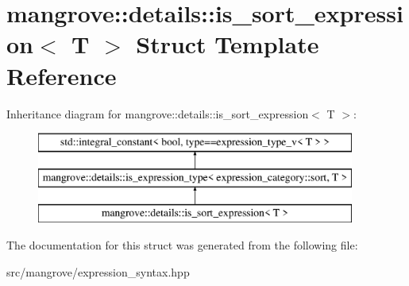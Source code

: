 \hypertarget{structmangrove_1_1details_1_1is__sort__expression}{}\section{mangrove\+:\+:details\+:\+:is\+\_\+sort\+\_\+expression$<$ T $>$ Struct Template Reference}
\label{structmangrove_1_1details_1_1is__sort__expression}
Inheritance diagram for mangrove\+:\+:details\+:\+:is\+\_\+sort\+\_\+expression$<$ T $>$\+:\begin{figure}[H]
\begin{center}
\leavevmode
\includegraphics[height=3.000000cm]{structmangrove_1_1details_1_1is__sort__expression}
\end{center}
\end{figure}


The documentation for this struct was generated from the following file\+:\begin{DoxyCompactItemize}
\item 
src/mangrove/expression\+\_\+syntax.\+hpp\end{DoxyCompactItemize}
